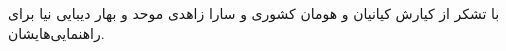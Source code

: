 \documentclass[]{article}
\begin{document}
\printheader
با تشکر از کیارش کیانیان و هومان کشوری و سارا زاهدی موحد و بهار دیبایی نیا برای راهنمایی‌هایشان.






\end{document}
